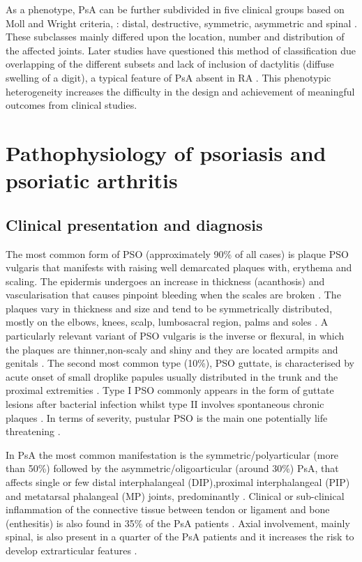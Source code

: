 As a phenotype, PsA can be further subdivided in five clinical groups based on Moll and Wright criteria, : distal, destructive, symmetric, asymmetric and spinal \parencite{Moll1973}. These subclasses mainly differed upon the location, number and distribution of the affected joints. Later studies have questioned this method of classification due overlapping of the different subsets and lack of  inclusion of dactylitis (diffuse swelling of a digit), a typical feature of PsA absent in RA \parencite{Reich2009}. This phenotypic heterogeneity increases the difficulty in the design and achievement of meaningful outcomes from clinical studies.



\section{Pathophysiology of psoriasis and psoriatic arthritis}

\subsection{Clinical presentation and diagnosis}
%
The most common form of PSO (approximately 90\% of all cases) is plaque PSO vulgaris that manifests with raising well demarcated plaques with, erythema and scaling. The epidermis undergoes an increase in thickness (acanthosis) and vascularisation that causes pinpoint bleeding when the scales are broken \parencite{Perera2012}. The plaques vary in thickness and size and tend to be symmetrically distributed, mostly on the elbows, knees, scalp, lumbosacral region, palms and soles \parencite{Griffiths2007}. A particularly relevant variant of PSO vulgaris is the inverse or flexural, in which the plaques are thinner,non-scaly and shiny and they are located armpits and genitals \parencite{Sampogna2012}. The second most common type (10\%), PSO guttate, is characterised by acute onset of small droplike papules usually distributed in the trunk and the proximal extremities \parencite{Vence2015}. Type I PSO commonly appears in the form of guttate lesions after  bacterial infection whilst type II involves spontaneous chronic plaques \parencite{Perera2012}. In terms of severity, pustular PSO is the main one potentially life threatening \parencite{Moura2015}.

In PsA the most common manifestation is the symmetric/polyarticular (more than 50\%) followed by the asymmetric/oligoarticular (around 30\%) PsA, that affects single or few distal interphalangeal (DIP),proximal interphalangeal (PIP) and metatarsal phalangeal (MP) joints, predominantly \parencite{Reich2009, McGonagle2011}. Clinical or sub-clinical inflammation of the connective tissue between tendon or ligament and bone (enthesitis) is also found in 35\% of the PsA patients \parencite {McGonagle2011,Polachek2017}. Axial involvement, mainly spinal, is also present in a quarter of the PsA patients and it increases the risk to develop extrarticular features \parencite{Jadon2016}. 

